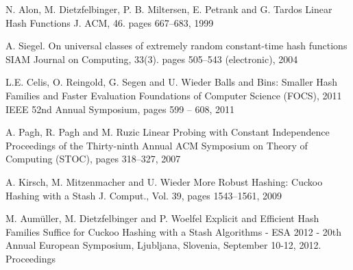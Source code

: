\documentclass{article}
\begin{document}
\begin{thebibliography}{32}
N. Alon, M. Dietzfelbinger, P. B. Miltersen, E. Petrank and G. Tardos
\newblock Linear Hash Functions
\newblock J. {ACM}, 46. pages 667--683, 1999

A. Siegel. 
\newblock On universal classes of extremely random constant-time hash functions
\newblock SIAM Journal on Computing, 33(3). pages 505--543 (electronic), 2004

L.E. Celis, O. Reingold, G. Segen and U. Wieder
\newblock Balls and Bins: Smaller Hash Families and Faster Evaluation
\newblock Foundations of Computer Science (FOCS), 2011 IEEE 52nd Annual Symposium, pages 599 -- 608, 2011

A. Pagh, R. Pagh and M. Ruzic
\newblock Linear Probing with Constant Independence
\newblock Proceedings of the Thirty-ninth Annual ACM Symposium on Theory of Computing (STOC), pages 318--327, 2007 

A. Kirsch, M. Mitzenmacher and U. Wieder
\newblock More Robust Hashing: Cuckoo Hashing with a Stash
 J. Comput., Vol. 39, pages 1543--1561, 2009
               
M. Aum{\"{u}}ller, M. Dietzfelbinger and P. Woelfel
\newblock Explicit and Efficient Hash Families Suffice for Cuckoo Hashing with a Stash
\newblock Algorithms - {ESA} 2012 - 20th Annual European Symposium, Ljubljana, Slovenia, September 10-12, 2012. Proceedings




\end{thebibliography}
\end{document}
